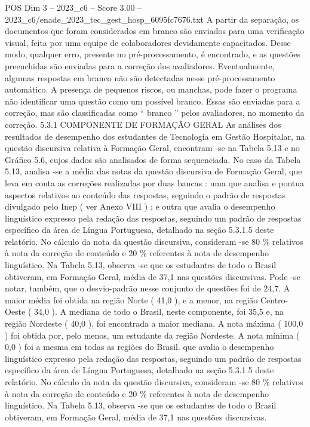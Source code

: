 \begin{textsample}{POS Dim 3 – 2023\_c6 – Score 3.00 – 2023\_c6/enade\_2023\_tec\_gest\_hosp\_6095fc7676.txt}
A partir da separação, os documentos que foram considerados em branco são enviados para uma verificação visual, feita por uma equipe de colaboradores devidamente capacitados.
Desse modo, qualquer erro, presente no pré-processamento, é encontrado, e as questões preenchidas são enviadas para a correção dos avaliadores.
Eventualmente, algumas respostas em branco não são detectadas nesse pré-processamento automático.
A presença de pequenos riscos, ou manchas, pode fazer o programa não identificar uma questão como um possível branco.
Essas são enviadas para a correção, mas são classificadas como “ branco ” pelos avaliadores, no momento da correção. 5.3.1 COMPONENTE DE FORMAÇÃO GERAL As análises dos resultados de desempenho dos estudantes de Tecnologia em Gestão Hospitalar, na questão discursiva relativa à Formação Geral, encontram -se na Tabela 5.13 e no Gráfico 5.6, cujos dados são analisados de forma sequenciada.
No caso da Tabela 5.13, analisa -se a média das notas da questão discursiva de Formação Geral, que leva em conta as correções realizadas por duas bancas : uma que analisa e pontua aspectos relativos ao conteúdo das respostas, seguindo o padrão de respostas divulgado pelo Inep ( ver Anexo VIII ) ; e outra que avalia o desempenho linguístico expresso pela redação das respostas, seguindo um padrão de respostas específico da área de Língua Portuguesa, detalhado na seção 5.3.1.5 deste relatório.
No cálculo da nota da questão discursiva, consideram -se 80 \% relativos à nota da correção de conteúdo e 20 \% referentes à nota de desempenho linguístico.
Na Tabela 5.13, observa -se que os estudantes de todo o Brasil obtiveram, em Formação Geral, média de 37,1 nas questões discursivas.
Pode -se notar, também, que o desvio-padrão nesse conjunto de questões foi de 24,7.
A maior média foi obtida na região Norte ( 41,0 ), e a menor, na região Centro-Oeste ( 34,0 ).
A mediana de todo o Brasil, neste componente, foi 35,5 e, na região Nordeste ( 40,0 ), foi encontrada a maior mediana.
A nota máxima ( 100,0 ) foi obtida por, pelo menos, um estudante da região Nordeste.
A nota mínima ( 0,0 ) foi a mesma em todas as regiões do Brasil. que avalia o desempenho linguístico expresso pela redação das respostas, seguindo um padrão de respostas específico da área de Língua Portuguesa, detalhado na seção 5.3.1.5 deste relatório.
No cálculo da nota da questão discursiva, consideram -se 80 \% relativos à nota da correção de conteúdo e 20 \% referentes à nota de desempenho linguístico.
Na Tabela 5.13, observa -se que os estudantes de todo o Brasil obtiveram, em Formação Geral, média de 37,1 nas questões discursivas.

\end{textsample}
